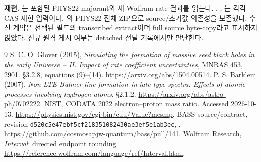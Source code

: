 \documentclass[11pt,a4paper]{article}
\begin{document}
\textbf{재현.} 는 포함된 PHYS22 majorant와 새 Wolfram rate 결과를 읽는다. , , 는 각각 CAS 재현 입력이다. 의 PHYS22 전체 ZIP으로 source/초기값 의존성을 보존했다. 수신 계약은 선택된 필드의 transcribed extract이며 full source byte-copy라고 표시하지 않았다. 신규 원격 게시 여부는 detached 전달 기록에서만 판단한다.

\begin{thebibliography}{9}\small
{} S. C. O. Glover (2015), \emph{Simulating the formation of massive seed black holes in the early Universe -- II. Impact of rate coefficient uncertainties}, MNRAS 453, 2901. \S3.2.8, equations (9)--(14). \url{https://arxiv.org/abs/1504.00514}.
 P. S. Barklem (2007), \emph{Non-LTE Balmer line formation in late-type spectra: Effects of atomic processes involving hydrogen atoms}. \S2.1.2. \url{https://arxiv.org/abs/astro-ph/0702222}.
 NIST, CODATA 2022 electron--proton mass ratio. Accessed 2026-10-13. \url{https://physics.nist.gov/cgi-bin/cuu/Value?mesmp}.
 BASS source/contract, revision \texttt{d520c5e47ebf5cf218351082430ae3ef5e1ab3ec}, . \url{https://github.com/cosmosapjw-quantum/bass/pull/141}.
 Wolfram Research, \emph{Interval}: directed endpoint rounding. \url{https://reference.wolfram.com/language/ref/Interval.html}.
\end{thebibliography}
\end{document}
